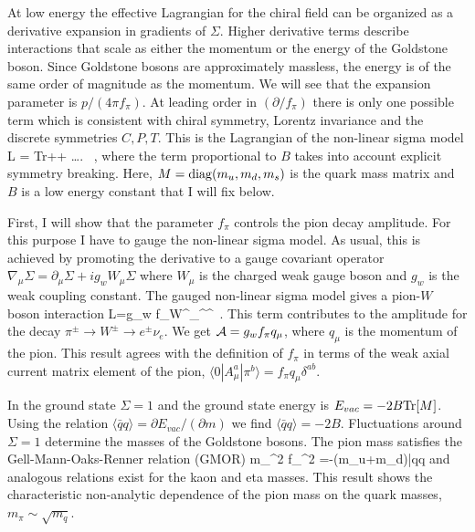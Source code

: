  At low energy the effective Lagrangian for the chiral field can be 
organized as a derivative expansion in gradients of $\Sigma$. Higher 
derivative terms describe interactions that scale as either the 
momentum or the energy of the Goldstone boson. Since Goldstone bosons 
are approximately massless, the energy is of the same order of magnitude 
as the momentum. We will see that the expansion parameter is $p/(4\pi 
f_\pi)$. At leading order in $(\partial/f_\pi)$ there is only one 
possible term which is consistent with chiral symmetry, Lorentz invariance 
and the discrete symmetries $C,P,T$. This is the Lagrangian of the 
non-linear sigma model
\be
\label{l_chpt}
{\mathcal L} =  {\rm Tr}\left[
 \partial_\mu\Sigma\partial^\mu\Sigma^\dagger\right] 
  +
+ \ldots. \, , 
\ee
where the term proportional to $B$ takes into account explicit symmetry 
breaking. Here, $M={\rm diag}(m_u,m_d,m_s)$ is the quark mass matrix 
and $B$ is a low energy constant that I will fix below. 

 First, I will show that the parameter $f_\pi$ controls the pion decay 
amplitude. For this purpose I have to gauge the non-linear sigma model. 
As usual, this is achieved by promoting the derivative to a gauge covariant 
operator $\nabla_\mu\Sigma = \partial_\mu\Sigma+ig_w W_\mu\Sigma$ where 
$W_\mu$ is the charged weak gauge boson and $g_w$ is the weak coupling 
constant. The gauged non-linear sigma model gives a pion-$W$ boson 
interaction 
\be 
{\mathcal L}=g_w f_\pi W^\pm_\mu \partial^\mu \pi^\mp\, .
\ee 
This term contributes to the amplitude for the decay $\pi^\pm\to 
W^\pm\to e^\pm\nu_e$. We get ${\cal A}=g_wf_\pi q_\mu$, where $q_\mu$ is 
the momentum of the pion. This result agrees with the definition of 
$f_\pi$ in terms of the weak axial current matrix element of the pion, 
$\langle 0|A_\mu^a|\pi^b\rangle = f_\pi q_\mu\delta^{ab}$. 

 In the ground state $\Sigma=1$ and the ground state energy is $E_{vac}=
-2B{\rm Tr}[M]$. Using the relation $\langle\bar{q}q\rangle = \partial 
E_{vac}/(\partial m)$ we find $\langle\bar{q}q\rangle=-2B$. Fluctuations 
around $\Sigma=1$ determine the masses of the Goldstone bosons. The 
pion mass satisfies the Gell-Mann-Oaks-Renner relation (GMOR) 
\cite{GellMann:1968rz}
\be
\label{GMOR}
m_\pi^2 f_\pi^2 =-(m_u+m_d)\langle\bar{q}q\rangle
\ee
and analogous relations exist for the kaon and eta masses. This result
shows the characteristic non-analytic dependence of the pion mass on
the quark masses, $m_\pi\sim \sqrt{m_q}$. 


